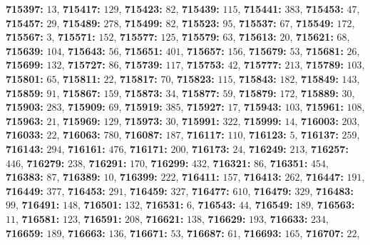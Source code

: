 \textsf{\bfseries 715397:} $13$, \textsf{\bfseries 715417:} $129$, \textsf{\bfseries 715423:} $82$, \textsf{\bfseries 715439:} $115$, \textsf{\bfseries 715441:} $383$, \textsf{\bfseries 715453:} $47$, \textsf{\bfseries 715457:} $29$, \textsf{\bfseries 715489:} $278$, \textsf{\bfseries 715499:} $82$, \textsf{\bfseries 715523:} $95$, \textsf{\bfseries 715537:} $67$, \textsf{\bfseries 715549:} $172$, \textsf{\bfseries 715567:} $3$, \textsf{\bfseries 715571:} $152$, \textsf{\bfseries 715577:} $125$, \textsf{\bfseries 715579:} $63$, \textsf{\bfseries 715613:} $20$, \textsf{\bfseries 715621:} $68$, \textsf{\bfseries 715639:} $104$, \textsf{\bfseries 715643:} $56$, \textsf{\bfseries 715651:} $401$, \textsf{\bfseries 715657:} $156$, \textsf{\bfseries 715679:} $53$, \textsf{\bfseries 715681:} $26$, \textsf{\bfseries 715699:} $132$, \textsf{\bfseries 715727:} $86$, \textsf{\bfseries 715739:} $117$, \textsf{\bfseries 715753:} $42$, \textsf{\bfseries 715777:} $213$, \textsf{\bfseries 715789:} $103$, \textsf{\bfseries 715801:} $65$, \textsf{\bfseries 715811:} $22$, \textsf{\bfseries 715817:} $70$, \textsf{\bfseries 715823:} $115$, \textsf{\bfseries 715843:} $182$, \textsf{\bfseries 715849:} $143$, \textsf{\bfseries 715859:} $91$, \textsf{\bfseries 715867:} $159$, \textsf{\bfseries 715873:} $34$, \textsf{\bfseries 715877:} $59$, \textsf{\bfseries 715879:} $172$, \textsf{\bfseries 715889:} $30$, \textsf{\bfseries 715903:} $283$, \textsf{\bfseries 715909:} $69$, \textsf{\bfseries 715919:} $385$, \textsf{\bfseries 715927:} $17$, \textsf{\bfseries 715943:} $103$, \textsf{\bfseries 715961:} $108$, \textsf{\bfseries 715963:} $21$, \textsf{\bfseries 715969:} $129$, \textsf{\bfseries 715973:} $30$, \textsf{\bfseries 715991:} $322$, \textsf{\bfseries 715999:} $14$, \textsf{\bfseries 716003:} $203$, \textsf{\bfseries 716033:} $22$, \textsf{\bfseries 716063:} $780$, \textsf{\bfseries 716087:} $187$, \textsf{\bfseries 716117:} $110$, \textsf{\bfseries 716123:} $5$, \textsf{\bfseries 716137:} $259$, \textsf{\bfseries 716143:} $294$, \textsf{\bfseries 716161:} $476$, \textsf{\bfseries 716171:} $200$, \textsf{\bfseries 716173:} $24$, \textsf{\bfseries 716249:} $213$, \textsf{\bfseries 716257:} $446$, \textsf{\bfseries 716279:} $238$, \textsf{\bfseries 716291:} $170$, \textsf{\bfseries 716299:} $432$, \textsf{\bfseries 716321:} $86$, \textsf{\bfseries 716351:} $454$, \textsf{\bfseries 716383:} $87$, \textsf{\bfseries 716389:} $10$, \textsf{\bfseries 716399:} $222$, \textsf{\bfseries 716411:} $157$, \textsf{\bfseries 716413:} $262$, \textsf{\bfseries 716447:} $191$, \textsf{\bfseries 716449:} $377$, \textsf{\bfseries 716453:} $291$, \textsf{\bfseries 716459:} $327$, \textsf{\bfseries 716477:} $610$, \textsf{\bfseries 716479:} $329$, \textsf{\bfseries 716483:} $99$, \textsf{\bfseries 716491:} $148$, \textsf{\bfseries 716501:} $132$, \textsf{\bfseries 716531:} $6$, \textsf{\bfseries 716543:} $44$, \textsf{\bfseries 716549:} $189$, \textsf{\bfseries 716563:} $11$, \textsf{\bfseries 716581:} $123$, \textsf{\bfseries 716591:} $208$, \textsf{\bfseries 716621:} $138$, \textsf{\bfseries 716629:} $193$, \textsf{\bfseries 716633:} $234$, \textsf{\bfseries 716659:} $189$, \textsf{\bfseries 716663:} $136$, \textsf{\bfseries 716671:} $53$, \textsf{\bfseries 716687:} $61$, \textsf{\bfseries 716693:} $165$, \textsf{\bfseries 716707:} $22$, 
